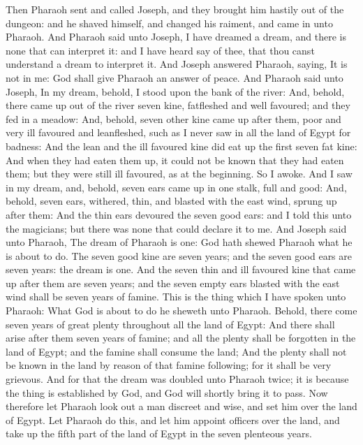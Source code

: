 \begin{biblechapter}
\verse Then Pharaoh sent and called Joseph, and they brought him hastily out of the dungeon: and he shaved himself, and changed his raiment, and came in unto Pharaoh.
\verse And Pharaoh said unto Joseph, I have dreamed a dream, and there is none that can interpret it: and I have heard say of thee, that thou canst understand a dream to interpret it.
\verse And Joseph answered Pharaoh, saying, It is not in me: God shall give Pharaoh an answer of peace.
\verse And Pharaoh said unto Joseph, In my dream, behold, I stood upon the bank of the river:
\verse And, behold, there came up out of the river seven kine, fatfleshed and well favoured; and they fed in a meadow:
\verse And, behold, seven other kine came up after them, poor and very ill favoured and leanfleshed, such as I never saw in all the land of Egypt for badness:
\verse And the lean and the ill favoured kine did eat up the first seven fat kine:
\verse And when they had eaten them up, it could not be known that they had eaten them; but they were still ill favoured, as at the beginning. So I awoke.
\verse And I saw in my dream, and, behold, seven ears came up in one stalk, full and good:
\verse And, behold, seven ears, withered, thin, and blasted with the east wind, sprung up after them:
\verse And the thin ears devoured the seven good ears: and I told this unto the magicians; but there was none that could declare it to me.
\verse And Joseph said unto Pharaoh, The dream of Pharaoh is one: God hath shewed Pharaoh what he is about to do.
\verse The seven good kine are seven years; and the seven good ears are seven years: the dream is one.
\verse And the seven thin and ill favoured kine that came up after them are seven years; and the seven empty ears blasted with the east wind shall be seven years of famine.
\verse This is the thing which I have spoken unto Pharaoh: What God is about to do he sheweth unto Pharaoh.
\verse Behold, there come seven years of great plenty throughout all the land of Egypt:
\verse And there shall arise after them seven years of famine; and all the plenty shall be forgotten in the land of Egypt; and the famine shall consume the land;
\verse And the plenty shall not be known in the land by reason of that famine following; for it shall be very grievous.
\verse And for that the dream was doubled unto Pharaoh twice; it is because the thing is established by God, and God will shortly bring it to pass.
\verse Now therefore let Pharaoh look out a man discreet and wise, and set him over the land of Egypt.
\verse Let Pharaoh do this, and let him appoint officers over the land, and take up the fifth part of the land of Egypt in the seven plenteous years.

\end{biblechapter}
